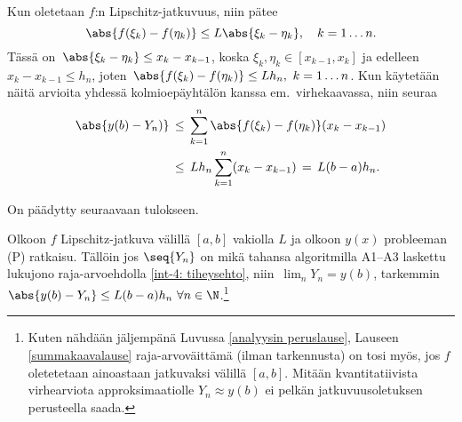 Kun oletetaan $f$:n Lipschitz-jatkuvuus, niin pätee
\[
\abs{f(\xi_k)-f(\eta_k)} \le L\abs{\xi_k-\eta_k}, \quad k=1 \ldots n.
\]
Tässä on $\,\abs{\xi_k-\eta_k} \le x_k-x_{k-1}$, koska $\xi_k,\eta_k\in[x_{k-1},x_k]$ ja
edelleen $x_k-x_{k-1} \le h_n$, joten $\,\abs{f(\xi_k)-f(\eta_k)} \le Lh_n,\ k=1 \ldots n$.
Kun käytetään näitä arvioita yhdessä kolmioepäyhtälön kanssa em.\ virhekaavassa, niin seuraa
\begin{align*}
\abs{y(b)-Y_n)} \,&\le\, \sum_{k=1}^n \abs{f(\xi_k)-f(\eta_k)}(x_k-x_{k-1}) \\
                  &\le\, Lh_n\sum_{k=1}^n (x_k-x_{k-1}) \,=\, L(b-a)h_n.
\end{align*}

On päädytty seuraavaan tulokseen.
\begin{Lause} \label{summakaavalause} Olkoon $f$ Lipschitz-jatkuva välillä $[a,b]$ vakiolla
$L$ ja olkoon $y(x)$ probleeman (P) ratkaisu. Tällöin jos $\seq{Y_n}$ on mikä tahansa
algoritmilla A1--A3 laskettu lukujono raja-arvoehdolla \eqref{int-4: tiheysehto}, niin
$\,\lim_nY_n=y(b)$, tarkemmin 
$\abs{y(b)-Y_n} \le L(b-a)h_n\ \forall n\in\N$.\footnote[2]{Kuten nähdään jäljempänä
Luvussa \ref{analyysin peruslause}, Lauseen \ref{summakaavalause} raja-arvoväittämä
(ilman tarkennusta) on tosi myös, jos $f$ oletetetaan ainoastaan jatkuvaksi välillä $[a,b]$.
Mitään kvantitatiivista virhearviota approksimaatiolle $Y_n \approx y(b)$ ei pelkän
jatkuvuusoletuksen perusteella saada.}
\end{Lause}

